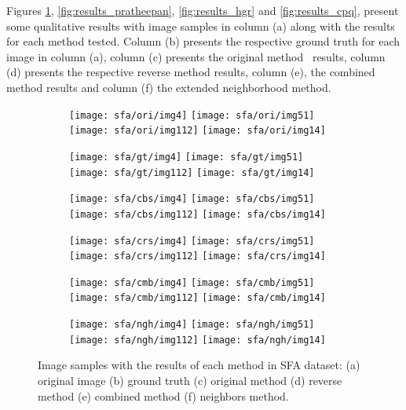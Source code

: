 Figures \ref{fig:results_sfa}, \ref{fig:results_pratheepan}, \ref{fig:results_hgr} and \ref{fig:results_cpq}, present some qualitative results with image samples in column (a) along with the results for each method tested. Column (b) presents the respective ground truth for each image in column (a), column (c) presents the original method~\cite{brancati:17} results, column (d) presents the respective reverse method results, column (e), the combined method results and column (f) the extended neighborhood method.


\begin{figure}[!htb]
    \centering
    \begin{subfigure}[t]{0.15\textwidth}
        \texttt{[image: sfa/ori/img4]}
        \texttt{[image: sfa/ori/img51]}
        \texttt{[image: sfa/ori/img112]}
        \texttt{[image: sfa/ori/img14]}
        \caption{}
    \end{subfigure}
    \begin{subfigure}[t]{0.15\textwidth}
        \texttt{[image: sfa/gt/img4]}
        \texttt{[image: sfa/gt/img51]}
        \texttt{[image: sfa/gt/img112]}
        \texttt{[image: sfa/gt/img14]}
        \caption{}
    \end{subfigure}
    \begin{subfigure}[t]{0.15\textwidth}
        \texttt{[image: sfa/cbs/img4]}
        \texttt{[image: sfa/cbs/img51]}
        \texttt{[image: sfa/cbs/img112]}
        \texttt{[image: sfa/cbs/img14]}
        \caption{}
    \end{subfigure}
    \begin{subfigure}[t]{0.15\textwidth}
        \texttt{[image: sfa/crs/img4]}
        \texttt{[image: sfa/crs/img51]}
        \texttt{[image: sfa/crs/img112]}
        \texttt{[image: sfa/crs/img14]}
        \caption{}
    \end{subfigure}
    \begin{subfigure}[t]{0.15\textwidth}
        \texttt{[image: sfa/cmb/img4]}
        \texttt{[image: sfa/cmb/img51]}
        \texttt{[image: sfa/cmb/img112]}
        \texttt{[image: sfa/cmb/img14]}
        \caption{}
    \end{subfigure}
    \begin{subfigure}[t]{0.15\textwidth}
        \texttt{[image: sfa/ngh/img4]}
        \texttt{[image: sfa/ngh/img51]}
        \texttt{[image: sfa/ngh/img112]}
        \texttt{[image: sfa/ngh/img14]}
        \caption{}
    \end{subfigure}

    \caption[Image samples with the results of each method in SFA dataset]{Image samples with the results of each method in SFA dataset: (a) original image (b) ground truth (c) original method \cite{brancati:17} (d) reverse method (e) combined method (f) neighbors method.}
    \label{fig:results_sfa}
\end{figure}


